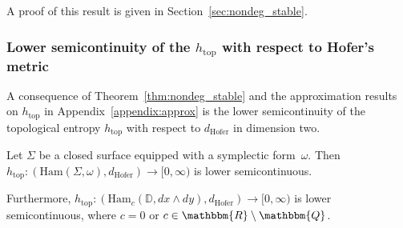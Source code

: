\documentclass[AHL,Unicode,longabstracts,published]{cedram}
\newcommand{\Q}{\mathbbm{Q}}
\newcommand{\R}{\mathbbm{R}}
\newcommand{\D}{\mathbb{D}}
\newcommand{\Ham}{\mathrm{Ham}}
\newcommand{\topo}{\mathrm{top}}
\newcommand{\hofer}{\mathrm{Hofer}}
\newcommand{\topo}{\mathrm{top}}
\newcommand{\hofer}{\mathrm{Hofer}}
\begin{document}
A proof of this result is given in Section~\ref{sec:nondeg_stable}.

\subsubsection{Lower semicontinuity of the \texorpdfstring{$h_{\topo}$}{h topo} with respect to Hofer's metric}


A consequence of Theorem~\ref{thm:nondeg_stable} and the approximation results on $h_{\topo}$ in Appendix~\ref{appendix:approx} is the lower semicontinuity of the topological entropy $h_{\topo}$ with respect to $d_{\hofer}$ in dimension two.

\begin{theo}\label{thm:htop_lowersemi}
Let $\Sigma$ be a closed surface equipped with a symplectic form~$\omega$. Then $h_{\topo}:(\Ham(\Sigma, \omega), d_\hofer) \to [0,\infty)$ is lower semicontinuous.

Furthermore, $h_{\topo}:(\Ham_c(\D, dx \wedge dy), d_\hofer) \to [0,\infty)$ is lower semicontinuous, where $c=0$ or $c\in \R \setminus \Q$.
\end{theo}
\end{document}
